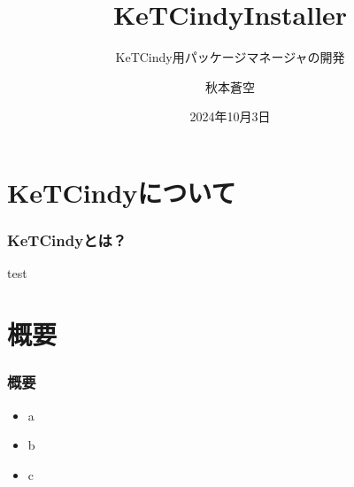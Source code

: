 \documentclass[unicode,12pt]{beamer}
\title{KeTCindyInstaller}
\subtitle{KeTCindy用パッケージマネージャの開発}
\author{秋本蒼空}
\date{2024年10月3日}
\institute{木更津工業高等専門学校 情報工学科 3年}
\begin{document}
    \maketitle
    \section{KeTCindyについて}
    \begin{frame}[t]
        \frametitle{KeTCindyとは？}
        test
    \end{frame}
    \section{概要}
    \begin{frame}[t]
        \frametitle{概要}
        \begin{itemize}
            \item a
            \item b
            \item c
        \end{itemize}
    \end{frame}
\end{document}
